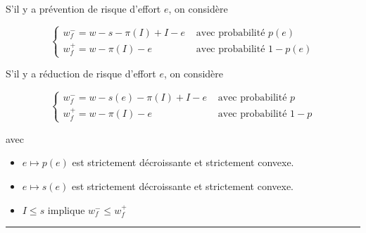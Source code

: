 \begin{f}
S'il y a prévention de risque d'effort $e$, on considère

$$
\begin{cases}w_{f}^{-}=w-s-\pi(I)+I-e & \text { avec probabilité } p(e) \\ w_{f}^{+}=w-\pi(I)-e & \text { avec probabilité } 1-p(e)\end{cases}
$$

S'il y a réduction de risque d'effort $e$, on considère

$$
\begin{cases}w_{f}^{-}=w-s(e)-\pi(I)+I-e & \text { avec probabilité } p \\ w_{f}^{+}=w-\pi(I)-e & \text { avec probabilité } 1-p\end{cases}
$$

avec
\begin{itemize}
	\item $e \mapsto p(e)$ est strictement décroissante et strictement convexe.
	\item $e \mapsto s(e)$ est strictement décroissante et strictement convexe.\\
	\item $I \leq s$ implique $w_{f}^{-} \leq w_{f}^{+}$
\end{itemize}

\end{f}
\hrule



